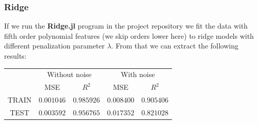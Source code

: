 \documentclass{article}
\begin{document}
\subsubsection{Ridge}
If we run the \textbf{Ridge.jl} program in the project repository
\cite{githubrepoproject1} we fit the data with fifth order polynomial features
(we skip orders lower here) to ridge models with different penalization
parameter $\lambda$. From that we can extract the following
results:\\
\begin{tabular}{| c | c | c | c | c |}
          & \multicolumn{2}{|c|}{Without noise} & \multicolumn{2}{|c|}{With noise}                           \\
          & MSE                                 & $R^2$                            & MSE        & $R^2$      \\
    TRAIN & $0.001046$                          & $0.985926$                       & $0.008400$ & $0.905406$ \\
    TEST  & $0.003592$                          & $0.956765$                       & $0.017352$ & $0.821028$ \\
\end{tabular}
\end{document}
